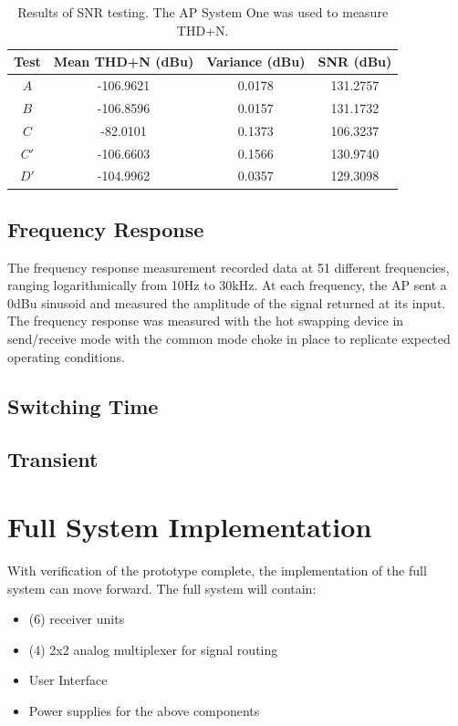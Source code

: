 \documentclass{article}
\begin{document}
	\begin{table}
	\begin{center}
	\begin{tabular}{ |c c c c| }
	\hline
	Test & Mean THD+N (dBu) & Variance (dBu) & SNR (dBu) \\ 
	 \hline
	$A$ & -106.9621   & 0.0178 	& 131.2757 \\
	$B$ & -106.8596   & 0.0157 	& 131.1732 \\
	$C$ &  -82.0101   & 0.1373  & 106.3237 \\
	$C'$ & -106.6603   & 0.1566 & 130.9740 \\
	$D'$ & -104.9962   & 0.0357 &  129.3098 \\
   	\hline
	\end{tabular}
	\caption{Results of SNR testing.  The AP System One was used to measure THD+N.}
	\label{tab:SNRresults}
	\end{center}
	\end{table}

	\subsection{Frequency Response}
	The frequency response measurement recorded data at 51 different frequencies, ranging logarithmically from 10Hz to 30kHz.  At each frequency, the AP sent a 0dBu sinusoid and measured the amplitude of the signal returned at its input.  The frequency response was measured with the hot swapping device in send/receive mode with the common mode choke in place to replicate expected operating conditions.

	\subsection{Switching Time}
	\subsection{Transient}



\section{Full System Implementation}
	With verification of the prototype complete, the implementation of the full system can move forward.  The full system will contain:

	\begin{itemize}
		\item (6) receiver units
		\item (4) 2x2 analog multiplexer for signal routing
		\item User Interface
		\item Power supplies for the above components
	\end{itemize}
\end{document}
